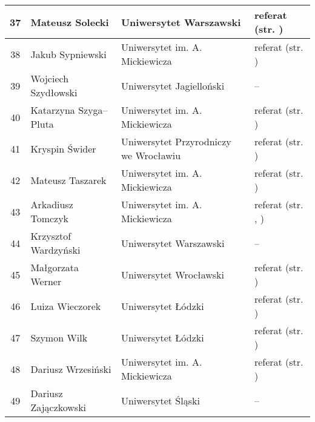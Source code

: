 \documentclass[12pt,oneside]{book}
\begin{document}
\begin{tabular}{||c|l|l|l||}
37	 & Mateusz Solecki & Uniwersytet Warszawski & referat (str. \pageref{solecki}) \\\hline	
38	 & Jakub Sypniewski & Uniwersytet im. A. Mickiewicza & referat (str. \pageref{sypniewski}) \\\hline
39	 & Wojciech Szydłowski & Uniwersytet Jagielloński & -- \\\hline
40	 & Katarzyna Szyga--Pluta & Uniwersytet im. A. Mickiewicza & referat (str. \pageref{kendzierski}) \\\hline
41	 & Kryspin Świder & Uniwersytet Przyrodniczy we Wrocławiu & referat (str. \pageref{swider}) \\\hline
42	 & Mateusz Taszarek & Uniwersytet im. A. Mickiewicza & referat (str. \pageref{taszarek}) \\\hline
43	 & Arkadiusz Tomczyk & Uniwersytet im. A. Mickiewicza & referat (str. \pageref{kendzierski}, \pageref{ptak}) \\\hline
44	 & Krzysztof Wardzyński & Uniwersytet Warszawski & -- \\\hline
45   & Małgorzata Werner & Uniwersytet Wrocławski & referat (str. \pageref{bilinska})  \\\hline
46   & Luiza Wieczorek & Uniwersytet Łódzki & referat (str. \pageref{wieczorek}) \\\hline
47   & Szymon Wilk & Uniwersytet Łódzki & referat (str. \pageref{wilk}) \\\hline
48   & Dariusz Wrzesiński & Uniwersytet im. A. Mickiewicza & referat (str. \pageref{ptak}) \\\hline
49   & Dariusz Zajączkowski & Uniwersytet Śląski & -- \\\hline
\hline
\hline
\end{tabular}


\printindex[a]
%


\backmatter



%
\end{document}

